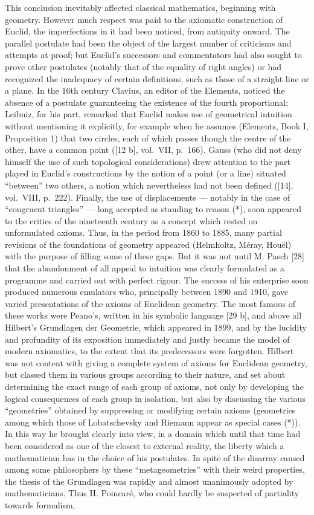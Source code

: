 This conclusion inevitably affected classical mathematics, beginning with geometry. However much respect was paid to the axiomatic construction of Euclid, the imperfections in it had been noticed, from antiquity onward. The parallel postulate had been the object of the largest number of criticisms and attempts at proof; but Euclid's successors and commentators had also sought to prove other postulates (notably that of the equality of right angles) or had recognized the inadequacy of certain definitions, such as those of a straight line or a plane. In the 16th century Clavius, an editor of the Elements, noticed the absence of a postulate guaranteeing the existence of the fourth proportional; Leibniz, for his part, remarked that Euclid makes use of geometrical intuition without mentioning it explicitly, for example when he assumes (Elements, Book I, Proposition 1) that two circles, each of which passes though the centre of the other, have a common point ({[}12 b{]}, vol.~VII, p.~166). Gauss (who did not deny himself the use of such topological considerations) drew attention to the part played in Euclid's constructions by the notion of a point (or a line) situated ``between'' two others, a notion which nevertheless had not been defined ({[}14{]}, vol.~VIII, p.~222). Finally, the use of displacements --- notably in the case of ``congruent triangles'' --- long accepted as standing to reason (*), soon appeared to the critics of the nineteenth century as a concept which rested on unformulated axioms. Thus, in the period from 1860 to 1885, many partial revisions of the foundations of geometry appeared (Helmholtz, Méray, Houël) with the purpose of filling some of these gaps. But it was not until M. Pasch {[}28{]} that the abandonment of all appeal to intuition was clearly formulated as a programme and carried out with perfect rigour. The success of his enterprise soon produced numerous emulators who, principally between 1890 and 1910, gave varied presentations of the axioms of Euclidean geometry. The most famous of these works were Peano's, written in his symbolic language {[}29 b{]}, and above all Hilbert's Grundlagen der Geometrie, which appeared in 1899, and by the lucidity and profundity of its exposition immediately and justly became the model of modern axiomatics, to the extent that its predecessors were forgotten. Hilbert was not content with giving a complete system of axioms for Euclidean geometry, but classed them in various groups according to their nature, and set about determining the exact range of each group of axioms, not only by developing the logical consequences of each group in isolation, but also by discussing the various ``geometries'' obtained by suppressing or modifying certain axioms (geometries among which those of Lobatschevsky and Riemann appear as special cases (*)). In this way he brought clearly into view, in a domain which until that time had been considered as one of the closest to external reality, the liberty which a mathematician has in the choice of his postulates. In spite of the disarray caused among some philosophers by these ``metageometries'' with their weird properties, the thesis of the Grundlagen was rapidly and almost unanimously adopted by mathematicians. Thus H. Poincaré, who could hardly be suspected of partiality towards formalism, 
